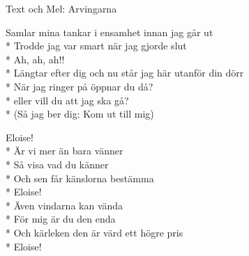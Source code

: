 \begin{SongText}[Eloise]
    \begin{SongInfo}
        Text och Mel: Arvingarna
    \end{SongInfo}
    \begin{SongVerse}
        Samlar mina tankar i ensamhet innan jag går ut\\*%
        Trodde jag var smart när jag gjorde slut\\*%
        Ah, ah, ah!!\\*%
        Längtar efter dig och nu står jag här utanför din dörr\\*%
        När jag ringer på öppnar du då?\\*%
        eller vill du att jag ska gå?\\*%
        (Så jag ber dig: Kom ut till mig)
    \end{SongVerse}
    \begin{SongVerse}
        Eloise!\\*%
        Är vi mer än bara vänner\\*%
        Så visa vad du känner\\*%
        Och sen får känslorna bestämma\\*%
        Eloise!\\*%
        Även vindarna kan vända\\*%
        För mig är du den enda\\*%
        Och kärleken den är värd ett högre pris\\*%
        Eloise!
    \end{SongVerse}
\end{SongText}
